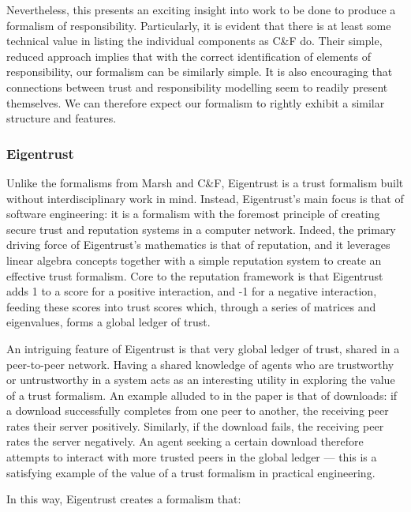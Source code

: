 Nevertheless, this presents an exciting insight into work to be done to produce a formalism of responsibility. Particularly, it is evident that there is at least some technical value in listing the individual components as C\&F do. Their simple, reduced approach implies that with the correct identification of elements of responsibility, our formalism can be similarly simple. It is also encouraging that connections between trust and responsibility modelling seem to readily present themselves. We can therefore expect our formalism to rightly exhibit a similar structure and features.\par

\subsubsection{Eigentrust}\label{subsec:eigentrust}
Unlike the formalisms from Marsh and C\&F, Eigentrust \parencite{eigentrust} is a trust formalism built without interdisciplinary work in mind. Instead, Eigentrust's main focus is that of software engineering: it is a formalism with the foremost principle of creating secure trust and reputation systems in a computer network. Indeed, the primary driving force of Eigentrust's mathematics is that of reputation, and it leverages linear algebra concepts together with a simple reputation system to create an effective trust formalism. Core to the reputation framework is that Eigentrust adds 1 to a score for a positive interaction, and -1 for a negative interaction, feeding these scores into trust scores which, through a series of matrices and eigenvalues, forms a global ledger of trust.\par

An intriguing feature of Eigentrust is that very global ledger of trust, shared in a peer-to-peer network. Having a shared knowledge of agents who are trustworthy or untrustworthy in a system acts as an interesting utility in exploring the value of a trust formalism. An example alluded to in the paper is that of downloads: if a download successfully completes from one peer to another, the receiving peer rates their server positively. Similarly, if the download fails, the receiving peer rates the server negatively. An agent seeking a certain download therefore attempts to interact with more trusted peers in the global ledger --- this is a satisfying example of the value of a trust formalism in practical engineering.\par

In this way, Eigentrust creates a formalism that:

